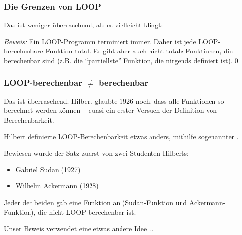 \documentclass[onlymath]{beamer}
\begin{document}
\begin{frame}\frametitle{Die Grenzen von LOOP}

\pause

Das ist weniger überraschend, als es vielleicht klingt:\smallskip

\emph{Beweis:} Ein LOOP-Programm terminiert immer. Daher ist jede LOOP-berechenbare Funktion total. Es gibt aber auch nicht-totale Funktionen, die berechenbar sind (z.B. die ``partiellste'' Funktion, die nirgends definiert ist).\qed
% 
% 
% 

\end{frame}


\begin{frame}\frametitle{LOOP-berechenbar $\neq$ berechenbar}

\pause

Das ist überraschend. Hilbert glaubte 1926 noch, dass alle Funktionen so berechnet werden können -- quasi ein erster Versuch der Definition von Berechenbarkeit.

{\tiny Hilbert definierte LOOP-Berechenbarkeit etwas anders, mithilfe sogenannter .
}\pause\bigskip

Bewiesen wurde der Satz zuerst von zwei Studenten Hilberts:
\begin{itemize}
\item Gabriel Sudan (1927)
\item Wilhelm Ackermann (1928)
\end{itemize}\pause
Jeder der beiden gab eine Funktion an (Sudan-Funktion und Ackermann-Funktion), die nicht LOOP-berechenbar ist.
\bigskip

Unser Beweis verwendet eine etwas andere Idee \ldots

\end{frame}
\end{document}
